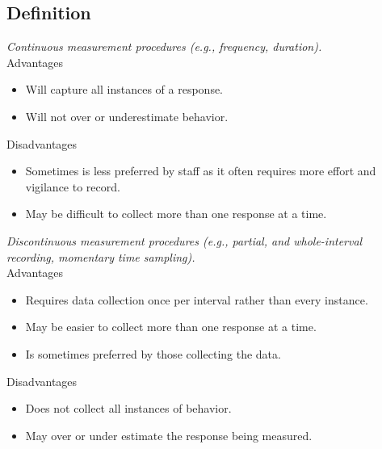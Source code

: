 \subsection{Definition}
\textit{Continuous measurement procedures (e.g., frequency, duration).}\\
Advantages
\begin{itemize}
\item Will capture all instances of a response.
\item Will not over or underestimate behavior.
\end{itemize}
Disadvantages
\begin{itemize}
\item Sometimes is less preferred by staff as it often requires more effort and vigilance to record.
\item May be difficult to collect more than one response at a time.
\end{itemize}
%
\textit{Discontinuous measurement procedures (e.g., partial, and whole-interval recording, momentary time sampling).}\\
Advantages
\begin{itemize}
\item Requires data collection once per interval rather than every instance.
\item May be easier to collect more than one response at a time.
\item Is sometimes preferred by those collecting the data.
\end{itemize}

Disadvantages
\begin{itemize}
\item Does not collect all instances of behavior.
\item May over or under estimate the response being measured.
\end{itemize}
%
